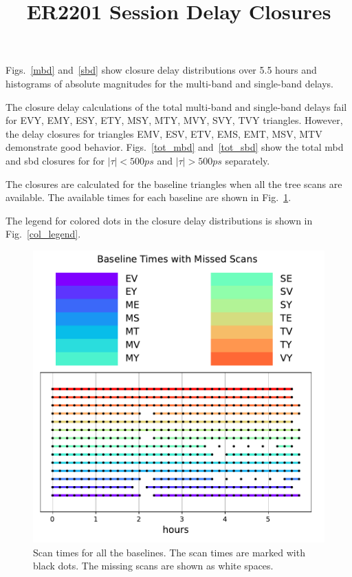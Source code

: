\documentclass[letterpaper,twoside,12pt]{article}
\title{ER2201 Session Delay Closures}
\begin{document}
\maketitle

Figs.~\ref{mbd} and~\ref{sbd} show closure delay distributions over 5.5 hours and histograms of absolute magnitudes for the multi-band and single-band delays.

The closure delay calculations of the total multi-band and single-band delays fail for EVY, EMY, ESY, ETY, MSY, MTY, MVY, SVY, TVY triangles. However, the delay closures for triangles EMV, ESV, ETV, EMS, EMT, MSV, MTV demonstrate good behavior. Figs.~\ref{tot_mbd} and~\ref{tot_sbd} show the total mbd and sbd closures for for $|\tau| < 500 ps$ and $|\tau| > 500 ps$ separately. 

The closures are calculated for the baseline triangles when all the tree scans are available. The available times for each baseline are shown in Fig.~\ref{time_gaps}.

The legend for colored dots in the closure delay distributions is shown in Fig.~\ref{col_legend}.


\begin{figure}[h!]
  \centering
  \includegraphics[width=30pc]{Gaps_in_Time.pdf}
  \caption{\small Scan times for all the baselines. The scan times are marked with black dots. The missing scans are shown as white spaces. }
  \label{time_gaps}
\end{figure}
\end{document}
